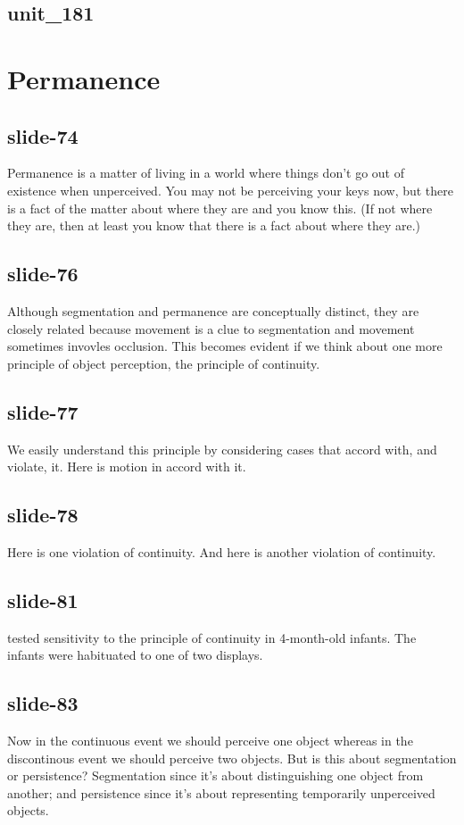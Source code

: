 \documentclass[12pt,\papersize]{extarticle}
\begin{document}
 
\subsection{unit\_181}
 
\section{Permanence}
 
 
\subsection{slide-74}
Permanence is a matter of living in a world where things don't go out of existence when unperceived.
You may not be perceiving your keys now, but there is a fact of the matter about where they are and you know this. (If not where they are, then at least you know that there is a fact about where they are.)
 
 
\subsection{slide-76}
Although segmentation and permanence are conceptually distinct, they are closely related because movement is a clue to segmentation and movement sometimes invovles occlusion.
This becomes evident if we think about one more principle of object perception, the principle of continuity.
 
 
\subsection{slide-77}
We easily understand this principle by considering cases that accord with, and violate, it.
Here is motion in accord with it.
 
 
\subsection{slide-78}
Here is one violation of continuity.
And here is another violation of continuity.
 
 
\subsection{slide-81}
\citet{spelke:1995_spatiotemporal} tested sensitivity to the principle of continuity in 4-month-old infants.
The infants were habituated to one of two displays.
 
 
\subsection{slide-83}
Now in the continuous event we should perceive one object whereas in the discontinous event we should perceive two objects.
But is this about segmentation or persistence?
Segmentation since it's about distinguishing one object from another; and persistence since it's about representing temporarily unperceived objects.
 
\end{document}
